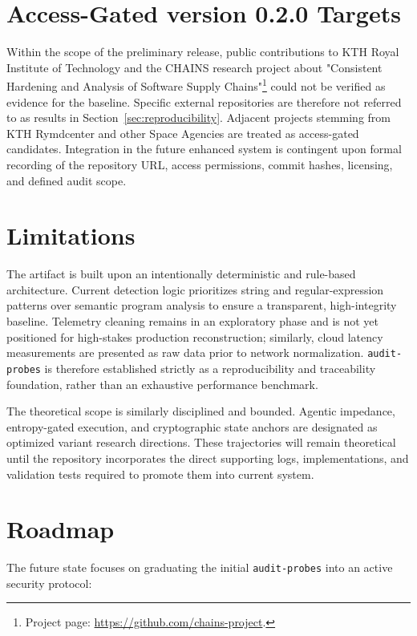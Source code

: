 \documentclass[11pt]{article}
\begin{document}
\section{Access-Gated version 0.2.0 Targets}

Within the scope of the preliminary release, public contributions to KTH Royal Institute of Technology and the CHAINS research project about "Consistent Hardening and Analysis of Software Supply Chains"\footnote{Project page: \url{https://github.com/chains-project}.} could not be verified as evidence for the baseline. Specific external repositories are therefore not referred to as results in Section~\ref{sec:reproducibility}. Adjacent projects stemming from KTH Rymdcenter and other Space Agencies are treated as access-gated candidates. Integration in the future enhanced system is contingent upon formal recording of the repository URL, access permissions, commit hashes, licensing, and defined audit scope.

\section{Limitations}

The artifact is built upon an intentionally deterministic and rule-based architecture. Current detection logic prioritizes string and regular-expression patterns over semantic program analysis to ensure a transparent, high-integrity baseline. Telemetry cleaning remains in an exploratory phase and is not yet positioned for high-stakes production reconstruction; similarly, cloud latency measurements are presented as raw data prior to network normalization. \texttt{audit-probes} is therefore established strictly as a reproducibility and traceability foundation, rather than an exhaustive performance benchmark.

The theoretical scope is similarly disciplined and bounded. Agentic impedance, entropy-gated execution, and cryptographic state anchors are designated 
as optimized variant research directions. These trajectories will remain theoretical until the repository incorporates the direct supporting logs, 
implementations, and validation tests required to promote them into current system.

\section{Roadmap}

The future state focuses on graduating the initial \texttt{audit-probes} into an active security protocol:
\end{document}
